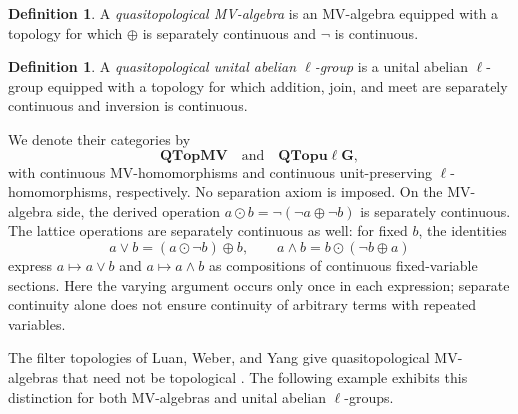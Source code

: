\documentclass[preprint,3p]{elsarticle}
\theoremstyle{plain}
\theoremstyle{definition}
\newtheorem{defn}[thm]{Definition}
\newcommand{\QTopMV}{\mathbf{QTopMV}}
\newcommand{\QTopulg}{\mathbf{QTopu\ell G}}
\numberwithin{equation}{section}
\begin{document}
\begin{defn}
A \emph{quasitopological MV-algebra} is an MV-algebra equipped with
a topology for which $\oplus$ is separately continuous and $\neg$
is continuous.
\end{defn}

\begin{defn}
A \emph{quasitopological unital abelian $\ell$-group} is a unital
abelian $\ell$-group equipped with a topology for which addition,
join, and meet are separately continuous and inversion is continuous.
\end{defn}

We denote their categories by
\[
 \QTopMV\quad\text{and}\quad\QTopulg,
\]
with continuous MV-homomorphisms and continuous unit-preserving
$\ell$-homomorphisms, respectively.  No separation axiom is imposed.
On the MV-algebra side, the derived operation
$a\odot b=\neg(\neg a\oplus\neg b)$ is separately continuous.
The lattice operations are separately continuous as well:
for fixed $b$, the identities
\begin{equation}
\label{eq-quasi-fixed-lattice}
 a\vee b=(a\odot\neg b)\oplus b,
 \qquad a\wedge b=b\odot(\neg b\oplus a)
\end{equation}
express $a\mapsto a\vee b$ and $a\mapsto a\wedge b$ as compositions
of continuous fixed-variable sections.
Here the varying argument occurs only once in each expression;
separate continuity alone does not ensure continuity of arbitrary
terms with repeated variables.

The filter topologies of Luan, Weber, and Yang give quasitopological
MV-algebras that need not be topological \cite{Luan2021}.
The following example exhibits this distinction for both MV-algebras
and unital abelian $\ell$-groups.
\end{document}
